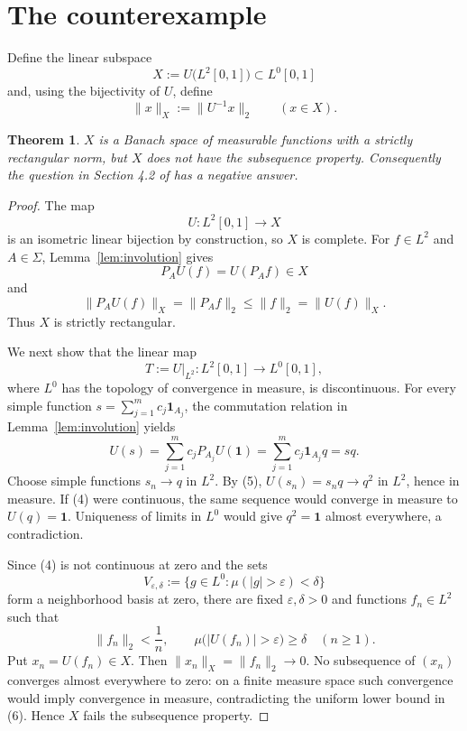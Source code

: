 \documentclass[11pt]{article}
\newtheorem{theorem}{Theorem}
\newcommand{\one}{\mathbf 1}
\begin{document}
\section{The counterexample}

Define the linear subspace
\[
 X:=U\bigl(L^2[0,1]\bigr)\subset L^0[0,1]
\]
and, using the bijectivity of $U$, define
\[
 \|x\|_X:=\|U^{-1}x\|_2\qquad(x\in X).
\]

\begin{theorem}\label{thm:counterexample}
$X$ is a Banach space of measurable functions with a strictly rectangular
norm, but $X$ does not have the subsequence property.  Consequently the
question in Section 4.2 of \cite{CFGS} has a negative answer.
\end{theorem}

\begin{proof}
The map
\[
 U:L^2[0,1]\longrightarrow X
\]
is an isometric linear bijection by construction, so $X$ is complete.  For
$f\in L^2$ and $A\in\Sigma$, Lemma~\ref{lem:involution} gives
\[
 P_AU(f)=U(P_Af)\in X
\]
and
\[
 \|P_AU(f)\|_X
 =\|P_Af\|_2
 \le\|f\|_2
 =\|U(f)\|_X.
 \tag{3}
\]
Thus $X$ is strictly rectangular.

We next show that the linear map
\[
 T:=U|_{L^2}:L^2[0,1]\longrightarrow L^0[0,1],
 \tag{4}
\]
where $L^0$ has the topology of convergence in measure, is discontinuous.
For every simple function
$s=\sum_{j=1}^m c_j\one_{A_j}$, the commutation relation in
Lemma~\ref{lem:involution} yields
\[
 U(s)
 =\sum_{j=1}^m c_jP_{A_j}U(\one)
 =\sum_{j=1}^m c_j\one_{A_j}q
 =sq.
 \tag{5}
\]
Choose simple functions $s_n\to q$ in $L^2$.  By (5),
$U(s_n)=s_nq\to q^2$ in $L^2$, hence in measure.  If (4) were continuous,
the same sequence would converge in measure to
$U(q)=\one$.  Uniqueness of limits in $L^0$ would give $q^2=\one$ almost
everywhere, a contradiction.

Since (4) is not continuous at zero and the sets
\[
 V_{\varepsilon,\delta}
 :=\{g\in L^0:\mu(|g|>\varepsilon)<\delta\}
\]
form a neighborhood basis at zero, there are fixed
$\varepsilon,\delta>0$ and functions $f_n\in L^2$ such that
\[
 \|f_n\|_2<\frac1n,\qquad
 \mu\bigl(|U(f_n)|>\varepsilon\bigr)\ge\delta
 \quad(n\ge1).
 \tag{6}
\]
Put $x_n=U(f_n)\in X$.  Then $\|x_n\|_X=\|f_n\|_2\to0$.  No subsequence of
$(x_n)$ converges almost everywhere to zero: on a finite measure space such
convergence would imply convergence in measure, contradicting the uniform
lower bound in (6).  Hence $X$ fails the subsequence property.
\end{proof}
\end{document}
